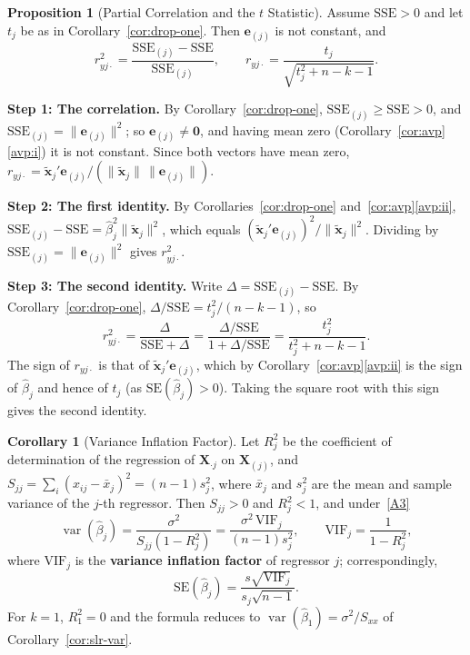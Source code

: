 \documentclass[12pt,a4paper]{article}
\makeatletter
\theoremstyle{definition}
\newtheorem{corollary}[theorem]{Corollary}
\newtheorem{proposition}[theorem]{Proposition}
\renewenvironment{proof}[1][\proofname]{\par
  \pushQED{\qed}%
  \normalfont \topsep6\p@\@plus6\p@\relax
  \trivlist
  \item[\hskip\labelsep\bfseries #1\@addpunct{.}]\ignorespaces
}{%
  \popQED\endtrivlist\@endpefalse
}
\DeclareMathOperator\var{var}
\newcommand{\SSE}{\mathrm{SSE}}
\newcommand{\SE}{\mathrm{SE}}
\newcommand{\bX}{\mathbf{X}}
\newcommand{\bx}{\mathbf{x}}
\newcommand{\bzero}{\mathbf{0}}
\newcommand{\VIF}{\mathrm{VIF}}
\makeatother
\begin{document}
\begin{proposition}[Partial Correlation and the $t$ Statistic]\label{prop:partial-t}
Assume $\SSE > 0$ and let $t_j$ be as in Corollary~\ref{cor:drop-one}. Then $\mathbf{e}_{(j)}$ is not constant, and
\[
r_{yj\cdot}^2 = \frac{\SSE_{(j)} - \SSE}{\SSE_{(j)}}, \qquad r_{yj\cdot} = \frac{t_j}{\sqrt{t_j^2 + n - k - 1}}.
\]
\end{proposition}

\begin{proof}
\textbf{Step 1: The correlation.} By Corollary~\ref{cor:drop-one}, $\SSE_{(j)} \geqslant \SSE > 0$, and $\SSE_{(j)} = \|\mathbf{e}_{(j)}\|^2$; so $\mathbf{e}_{(j)} \neq \bzero$, and having mean zero (Corollary~\ref{cor:avp}\ref{avp:i}) it is not constant. Since both vectors have mean zero, $r_{yj\cdot} = \tilde{\bx}_j'\mathbf{e}_{(j)}/(\|\tilde{\bx}_j\|\,\|\mathbf{e}_{(j)}\|)$.

\textbf{Step 2: The first identity.} By Corollaries~\ref{cor:drop-one} and~\ref{cor:avp}\ref{avp:ii}, $\SSE_{(j)} - \SSE = \hat\beta_j^2\|\tilde{\bx}_j\|^2$, which equals $(\tilde{\bx}_j'\mathbf{e}_{(j)})^2/\|\tilde{\bx}_j\|^2$. Dividing by $\SSE_{(j)} = \|\mathbf{e}_{(j)}\|^2$ gives $r_{yj\cdot}^2$.

\textbf{Step 3: The second identity.} Write $\Delta = \SSE_{(j)} - \SSE$. By Corollary~\ref{cor:drop-one}, $\Delta/\SSE = t_j^2/(n-k-1)$, so
\[
r_{yj\cdot}^2 = \frac{\Delta}{\SSE + \Delta} = \frac{\Delta/\SSE}{1 + \Delta/\SSE} = \frac{t_j^2}{t_j^2 + n - k - 1}.
\]
The sign of $r_{yj\cdot}$ is that of $\tilde{\bx}_j'\mathbf{e}_{(j)}$, which by Corollary~\ref{cor:avp}\ref{avp:ii} is the sign of $\hat\beta_j$ and hence of $t_j$ (as $\SE(\hat\beta_j) > 0$). Taking the square root with this sign gives the second identity.
\end{proof}

\begin{corollary}[Variance Inflation Factor]\label{cor:vif}
Let $R_j^2$ be the coefficient of determination of the regression of $\bX_{\cdot j}$ on $\bX_{(j)}$, and $S_{jj} = \sum_i(x_{ij} - \bar x_j)^2 = (n-1)s_j^2$, where $\bar x_j$ and $s_j^2$ are the mean and sample variance of the $j$-th regressor. Then $S_{jj} > 0$ and $R_j^2 < 1$, and under~\ref{A3}
\[
\var(\hat\beta_j) = \frac{\sigma^2}{S_{jj}(1 - R_j^2)} = \frac{\sigma^2\,\VIF_j}{(n-1)s_j^2}, \qquad \VIF_j = \frac{1}{1 - R_j^2},
\]
where $\VIF_j$ is the \textbf{variance inflation factor} of regressor $j$; correspondingly,
\[
\SE(\hat\beta_j) = \frac{s\sqrt{\VIF_j}}{s_j\sqrt{n-1}}.
\]
For $k = 1$, $R_1^2 = 0$ and the formula reduces to $\var(\hat\beta_1) = \sigma^2/S_{xx}$ of Corollary~\ref{cor:slr-var}.
\end{corollary}
\end{document}
